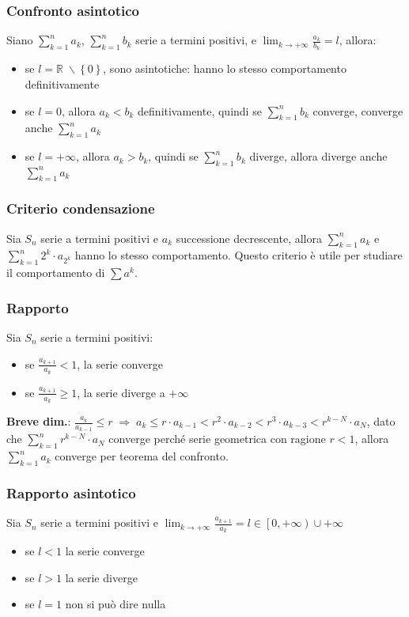 \documentclass[a4paper]{article}
\begin{document}
\subsubsection*{Confronto asintotico}
Siano \(\displaystyle \sum_{k = 1}^{n} a_k\), \(\displaystyle \sum_{k = 1}^{n} b_k\) serie a termini positivi, e \(\displaystyle \lim_{k \to +\infty} \frac{a_k}{b_k} = l\), allora:
\begin{itemize}
	\item se \(l = \mathbb{R} \; \backslash \left\{0\right\}\), sono asintotiche: hanno lo stesso comportamento definitivamente
	\item se \(l = 0\), allora \(a_k < b_k\) definitivamente, quindi se \(\sum_{k = 1}^{n} b_k\) converge, converge anche \(\sum_{k = 1}^{n} a_k\)
	\item se \(l = +\infty\), allora \(a_k > b_k\), quindi se \(\sum_{k = 1}^{n} b_k\) diverge, allora diverge anche \(\sum_{k = 1}^{n} a_k\)
\end{itemize}

\subsubsection*{Criterio condensazione}
Sia \(S_n\) serie a termini positivi e \(a_k\) successione decrescente, allora \(\sum_{k = 1}^n a_k\) e \(\sum_{k = 1}^n 2^k \cdot a_{2^k}\) hanno lo stesso comportamento.
Questo criterio è utile per studiare il comportamento di \(\sum a^k\).

\subsubsection*{Rapporto}
Sia \(S_n\) serie a termini positivi:
\begin{itemize}
	\item se \(\displaystyle \frac{a_{k + 1}}{a_k} < 1\), la serie converge
	\item se \(\displaystyle \frac{a_{k + 1}}{a_k} \geq 1\), la serie diverge a \(+ \infty\)
\end{itemize}
\textbf{Breve dim.}: \(\displaystyle \frac{a_k}{a_{k - 1}} \leq r \; \Rightarrow \; a_k \leq r \cdot a_{k-1} < r^2 \cdot a_{k-2} < r^3 \cdot a_{k-3} < r^{k-N} \cdot a_N\),
dato che \(\sum_{k=1}^{n} r^{k-N} \cdot a_N\) converge perché serie geometrica con ragione \(r < 1\), allora \(\sum_{k=1}^{n} a_k\) converge per teorema del confronto.

\subsubsection*{Rapporto asintotico}
Sia \(S_n\) serie a termini positivi e \(\displaystyle \lim_{k \to +\infty} \frac{a_{k+1}}{a_k} = l \in \left[0, +\infty \right) \cup +\infty \)
\begin{itemize}
	\item se \(l < 1\) la serie converge
	\item se \(l > 1\) la serie diverge
	\item se \(l = 1\) non si può dire nulla
\end{itemize}
\end{document}
